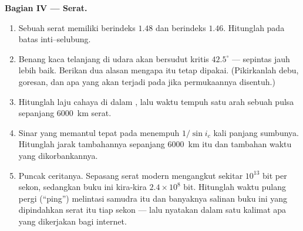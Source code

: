 \begin{problem}
\medskip
\noindent\textbf{Bagian IV --- Serat.}
\begin{enumerate}[resume]
  \item Sebuah serat memiliki  berindeks $1.48$ dan 
        berindeks $1.46$. Hitunglah  pada batas
        inti--selubung.
  \item Benang kaca telanjang di udara akan bersudut kritis
        $42.5^\circ$ --- sepintas jauh lebih baik. Berikan dua alasan
        mengapa  itu tetap dipakai. (Pikirkanlah debu, goresan,
        dan apa yang akan terjadi pada  jika
        permukaannya disentuh.)
  \item Hitunglah laju cahaya di dalam , lalu waktu tempuh satu
        arah sebuah pulsa sepanjang \qty{6000}{km} serat.
  \item Sinar yang memantul tepat pada  menempuh
        $1/\sin i_c$ kali panjang sumbunya. Hitunglah jarak tambahannya
        sepanjang \qty{6000}{km} itu dan tambahan waktu yang
        dikorbankannya.
  \item Puncak ceritanya. Sepasang serat modern mengangkut sekitar
        $10^{13}$ bit per sekon, sedangkan buku ini kira-kira
        $2.4 \times 10^8$ bit. Hitunglah waktu pulang pergi (``ping'')
        melintasi samudra itu dan banyaknya salinan buku ini yang
        dipindahkan serat itu tiap sekon --- lalu nyatakan dalam satu
        kalimat apa yang dikerjakan  bagi internet.
\end{enumerate}
\end{problem}
